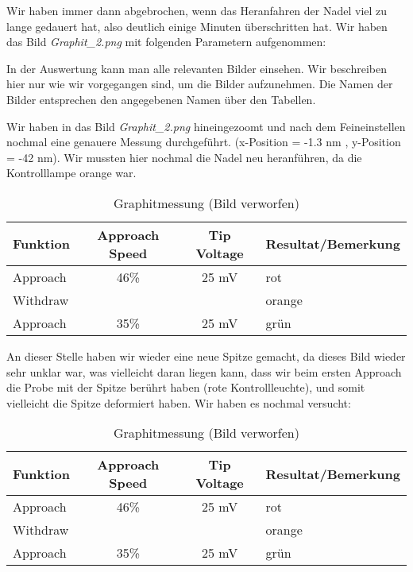 Wir haben immer dann abgebrochen, wenn das Heranfahren der Nadel viel zu lange gedauert hat, also deutlich einige Minuten überschritten hat. Wir haben das Bild \emph{Graphit\_2.png} mit folgenden Parametern aufgenommen: 


In der Auswertung kann man alle relevanten Bilder einsehen. Wir beschreiben hier nur wie wir vorgegangen sind, um die Bilder aufzunehmen. Die Namen der Bilder entsprechen den angegebenen Namen über den Tabellen.

Wir haben in das Bild \emph{Graphit\_2.png} hineingezoomt und nach dem Feineinstellen nochmal eine genauere Messung durchgeführt. (x-Position = -1.3 nm , y-Position = -42 nm). Wir mussten hier nochmal die Nadel neu heranführen, da die Kontrolllampe orange war. 

\begin{table}[H]
\caption{Graphitmessung (Bild verworfen)}
\centering \begin{tabular}[H]{l c c l}
Funktion & Approach Speed & Tip Voltage & Resultat/Bemerkung\\ \hline 
Approach & 46\% & 25 mV & rot\\
Withdraw & & & orange\\
Approach & 35\% & 25 mV & grün\\
\end{tabular}
\end{table}


An dieser Stelle haben wir wieder eine neue Spitze gemacht, da dieses Bild wieder sehr unklar war, was vielleicht daran liegen kann, dass wir beim ersten Approach die Probe mit der Spitze berührt haben (rote Kontrollleuchte), und somit vielleicht die Spitze deformiert haben. Wir haben es nochmal versucht:

\begin{table}[H]
\caption{Graphitmessung (Bild verworfen)}
\centering \begin{tabular}[H]{l c c l} 
Funktion & Approach Speed & Tip Voltage & Resultat/Bemerkung\\ \hline
Approach & 46\% & 25 mV & rot\\
Withdraw & & & orange\\
Approach & 35\% & 25 mV & grün\\
\end{tabular}
\end{table}

